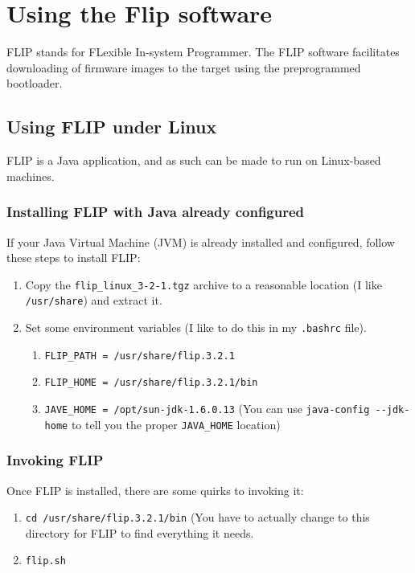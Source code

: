 \section{Using the Flip software}
FLIP stands for FLexible In-system Programmer.  The FLIP software facilitates 
downloading of firmware images to the target using the preprogrammed 
bootloader.

\subsection{Using FLIP under Linux}
FLIP is a Java application, and as such can be made to run on Linux-based 
machines.  

\subsubsection{Installing FLIP with Java already configured}
If your Java Virtual Machine (JVM) is already installed and configured, follow 
these steps to install FLIP:
\begin{enumerate}
	\item Copy the \verb+flip_linux_3-2-1.tgz+ archive to a reasonable 
	location (I like \verb+/usr/share+) and extract it.
	\item Set some environment variables (I like to do this in my 
	\verb+.bashrc+ file).
	\begin{enumerate}
		\item \verb+FLIP_PATH = /usr/share/flip.3.2.1+
		\item \verb+FLIP_HOME = /usr/share/flip.3.2.1/bin+
		\item \verb+JAVE_HOME = /opt/sun-jdk-1.6.0.13+ (You can use 
			\verb+java-config --jdk-home+ to tell you the proper \verb+JAVA_HOME+ 
			location)
	\end{enumerate}	
\end{enumerate}


\subsubsection{Invoking FLIP}
Once FLIP is installed, there are some quirks to invoking it:
\begin{enumerate}
	\item \verb+cd /usr/share/flip.3.2.1/bin+ (You have to actually change to 
	this directory for FLIP to find everything it needs.
	\item \verb+flip.sh+
\end{enumerate}

